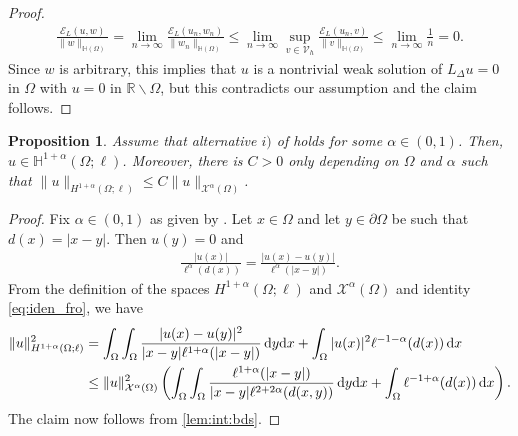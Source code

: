 \documentclass[11 pt]{article}
\newtheorem{proposition}[theorem]{Proposition}
\numberwithin{equation}{section}
\def\R{\mathbb{R}}
\def\cE{\mathcal{E}}
\def\d{\textnormal{d}}
\begin{document}
\begin{proof}
\begin{align*}
    \frac{\cE_{L}(u,w)}{\|w\|_{\mathbb H(\Omega)}}=\lim_{n\to\infty}\frac{\cE_{L}(u_n,w_n)}{\|w_n\|_{\mathbb H(\Omega)}}\leq \lim_{n\to\infty}\sup_{v\in \mathcal V_h}\frac{\cE_{L}(u_n,v)}{\|v\|_{\mathbb H(\Omega)}}\leq \lim_{n\to\infty}\frac{1}{n}=0.
\end{align*}
Since $w$ is arbitrary, this implies that $u$ is a nontrivial weak solution of $L_\Delta u=0$ in $\Omega$ with $u=0$ in $\R\backslash  \Omega$, but this contradicts our assumption and the claim follows. 
\end{proof}



\begin{proposition}\label{prop:more_regularity}
Assume that alternative $i)$ of  holds for some $\alpha\in(0,1)$. Then, $u\in \mathbb H^{1+\alpha}(\Omega;\ell)$. Moreover, there is $C>0$ only depending on $\Omega$ and $\alpha$ such that $\|u\|_{H^{1+\alpha}(\Omega;\ell)}\leq C\|u\|_{\mathcal X^{\alpha}(\Omega)}$.
\end{proposition}
%
\begin{proof}
Fix $\alpha\in(0,1)$ as given by . Let $x\in \Omega$ and let $y\in\partial \Omega$ be such that $d(x)=|x-y|$. Then $u(y)=0$ and 
%
\begin{align}\label{eq:iden_fro}
    \frac{|u(x)|}{\ell^{\alpha}(d(x))}=\frac{|u(x)-u(y)|}{\ell^{\alpha}(|x-y|)}.
\end{align}
%
From the definition of the spaces $H^{1+\alpha}(\Omega;\ell)$ and $\mathcal X^\alpha(\Omega)$ and identity \eqref{eq:iden_fro}, we have
%
\begin{align}\notag
    \|u\|^2_{H^{1+\alpha}(\Omega;\ell)}&=\int_{\Omega}\int_{\Omega}\frac{|u(x)-u(y)|^2}{|x-y|\ell^{1+\alpha}(|x-y|)}\, \d{y} \d{x}+\int_{\Omega}|u(x)|^2\ell^{-1-\alpha}(d(x))\,\d{x} \\
    &\leq \|u\|^2_{\mathcal X^{\alpha}(\Omega)}\left(\int_{\Omega}\int_{\Omega}\frac{\ell^{1+\alpha}(|x-y|)}{|x-y|\ell^{2+2\alpha}(d(x,y))}\,\d{y}\d{x}+ \int_{\Omega}\ell^{-1+\alpha}(d(x))\,\d{x}\right).\label{a6}
\end{align}
%
The claim now follows from \eqref{lem:int:bds}.
\end{proof}
%
\end{document}
